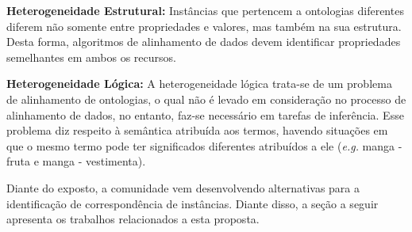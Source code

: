 \textbf{Heterogeneidade Estrutural:}
Instâncias que pertencem a ontologias diferentes diferem não somente entre propriedades e valores, mas também na sua estrutura. Desta forma, algoritmos de alinhamento de dados devem identificar propriedades semelhantes em ambos os recursos.


\textbf{Heterogeneidade Lógica:}
% 
% 
%
%
A heterogeneidade lógica trata-se de um problema de alinhamento de ontologias, o qual não é levado em consideração no processo de alinhamento de dados, no entanto, faz-se necessário em tarefas de inferência. Esse problema diz respeito à semântica atribuída aos termos, havendo situações em que o mesmo termo pode ter significados diferentes atribuídos a ele (\textit{e.g.} manga - fruta e manga - vestimenta).

Diante do exposto, a comunidade vem desenvolvendo alternativas para a identificação de correspondência de instâncias. Diante disso, a seção a seguir apresenta os trabalhos relacionados a esta proposta.
% 
% 
% 

